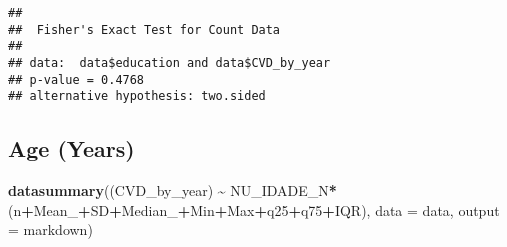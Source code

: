 \documentclass[
]{article}
\newenvironment{Shaded}{\begin{snugshade}}{\end{snugshade}}
\newcommand{\AttributeTok}[1]{\textcolor[rgb]{0.13,0.29,0.53}{#1}}
\newcommand{\FunctionTok}[1]{\textcolor[rgb]{0.13,0.29,0.53}{\textbf{#1}}}
\newcommand{\NormalTok}[1]{#1}
\newcommand{\SpecialCharTok}[1]{\textcolor[rgb]{0.81,0.36,0.00}{\textbf{#1}}}
\newcommand{\StringTok}[1]{\textcolor[rgb]{0.31,0.60,0.02}{#1}}
\begin{document}
\begin{verbatim}
## 
##  Fisher's Exact Test for Count Data
## 
## data:  data$education and data$CVD_by_year
## p-value = 0.4768
## alternative hypothesis: two.sided
\end{verbatim}

\hypertarget{age-years}{%
\subsection{Age (Years)}\label{age-years}}

\begin{Shaded}
\begin{Highlighting}[]
\FunctionTok{datasummary}\NormalTok{((CVD\_by\_year) }\SpecialCharTok{\textasciitilde{}}\NormalTok{ NU\_IDADE\_N}\SpecialCharTok{*}\NormalTok{(n}\SpecialCharTok{+}\NormalTok{Mean\_}\SpecialCharTok{+}\NormalTok{SD}\SpecialCharTok{+}\NormalTok{Median\_}\SpecialCharTok{+}\NormalTok{Min}\SpecialCharTok{+}\NormalTok{Max}\SpecialCharTok{+}\NormalTok{q25}\SpecialCharTok{+}\NormalTok{q75}\SpecialCharTok{+}\NormalTok{IQR),}
            \AttributeTok{data =}\NormalTok{ data, }\AttributeTok{output =} \StringTok{\textquotesingle{}markdown\textquotesingle{}}\NormalTok{)}
\end{Highlighting}
\end{Shaded}
\end{document}
